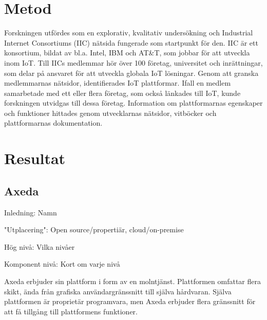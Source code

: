 
\section{Metod}
\label{sec:esimluku}
Forskningen utfördes som en explorativ, kvalitativ undersökning och
Industrial Internet Consortiums (IIC) nätsida fungerade som startpunkt för den.
IIC är ett konsortium, bildat av bl.a. Intel, IBM och AT\&T, som jobbar
för att utveckla  inom IoT.
Till IICs medlemmar hör över 100 företag, universitet och inrättningar, som
delar på ansvaret för att utveckla globala IoT lösningar.
Genom att granska medlemmarnas nätsidor, identifierades IoT plattformar.
Ifall en medlem samarbetade med ett eller flera företag, som också länkades
till IoT, kunde forskningen utvidgas till dessa företag.
Information om plattformarnas egenskaper och funktioner hittades genom
utvecklarnas nätsidor, vitböcker och plattformarnas dokumentation.




\section{Resultat}
\label{sec:esimluku}

\subsection{Axeda}
Inledning:
Namn 

"Utplacering":
Open source/propertiär, cloud/on-premise

Hög nivå:
Vilka nivåer

Komponent nivå:
Kort om varje nivå

Axeda erbjuder sin plattform i form av en molntjänst. Plattformen omfattar
flera skikt, ända från grafiska användargränssnitt till själva hårdvaran.
Själva plattformen är proprietär programvara, men Axeda erbjuder flera 
gränssnitt för att få tillgång till plattformens funktioner.

